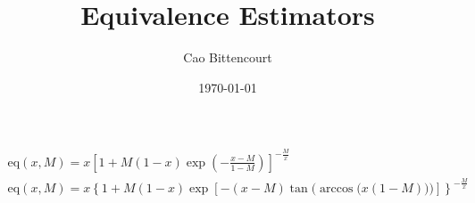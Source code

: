 \documentclass{article}
\title{Equivalence Estimators}
\author{Cao Bittencourt}
\date{\today}
\begin{document}
    \begin{gather}
        \text{eq}(x,M) = x \left[
            1 + M(1-x)\exp\left(
                -\frac{x-M}{1-M}
            \right)
        \right] ^ {-\frac{M}{x}}\\
        \text{eq}(x,M) = x \left\{ 
            1 + M(1-x)\exp\left[
                -(x-M)
                \tan\bigg(
                    \arccos\big(
                        x(1-M)
                    \big)
                \bigg)
            \right]
        \right\} ^ {-\frac{M}{x}}
    \end{gather}
\end{document}
